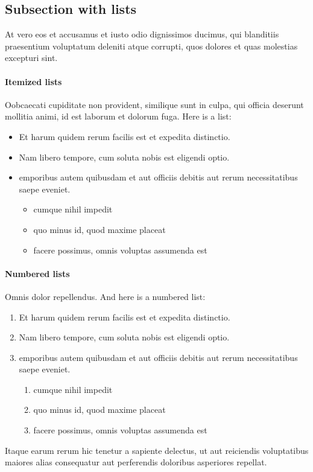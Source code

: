 \documentclass[letterpaper,12pt,leqno]{article}
\begin{document}
\subsection{Subsection with lists}\label{s:lists}

At vero eos et accusamus et iusto odio dignissimos ducimus, qui blanditiis praesentium voluptatum deleniti atque corrupti, quos dolores et quas molestias excepturi sint.

\paragraph{Itemized lists} Oobcaecati cupiditate non provident, similique sunt in culpa, qui officia deserunt mollitia animi, id est laborum et dolorum fuga. Here is a list:
\begin{itemize}
 	\item Et harum quidem rerum facilis est et expedita distinctio.
 	\item Nam libero tempore, cum soluta nobis est eligendi optio.
 	\item emporibus autem quibusdam et aut officiis debitis aut rerum necessitatibus saepe eveniet.
 		\begin{itemize}
 			\item cumque nihil impedit
 			\item quo minus id, quod maxime placeat
 			\item facere possimus, omnis voluptas assumenda est
 		\end{itemize}
\end{itemize}

\paragraph{Numbered lists} Omnis dolor repellendus. And here is a numbered list:
\begin{enumerate}
 	\item Et harum quidem rerum facilis est et expedita distinctio.
 	\item Nam libero tempore, cum soluta nobis est eligendi optio.
 	\item emporibus autem quibusdam et aut officiis debitis aut rerum necessitatibus saepe eveniet.
	\begin{enumerate}
 			\item cumque nihil impedit
 			\item quo minus id, quod maxime placeat
 			\item facere possimus, omnis voluptas assumenda est
 	\end{enumerate}
\end{enumerate}
Itaque earum rerum hic tenetur a sapiente delectus, ut aut reiciendis voluptatibus maiores alias consequatur aut perferendis doloribus asperiores repellat. 
\end{document}
